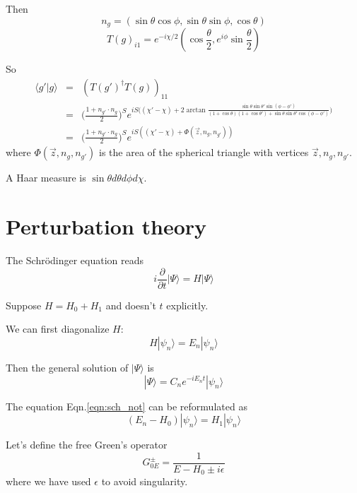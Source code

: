 \documentclass[12pt]{book}
\begin{document}
	Then
	\begin{equation}
		n_g=(\sin\theta\cos\phi,\sin\theta\sin\phi,\cos\theta)
	\end{equation}
	\begin{equation}
		T(g)_{i1}=e^{-i\chi/2}(\cos\frac \theta 2,e^{i\phi}\sin\frac \theta 2)
	\end{equation}
	
	So
	\begin{eqnarray}
		\langle g'|g\rangle&=&(T(g')^\dagger T(g))_{11}\\
		&=&\Big(\frac{1+n_{g'}\cdot n_g}2\Big)^Se^{iS\big((\chi'-\chi)+2\arctan\frac{\sin\theta\sin\theta'\sin(\phi-\phi')}{(1+\cos\theta)(1+\cos\theta')+\sin\theta\sin\theta'\cos(\phi-\phi')}\big)}\\
		&=&\Big(\frac{1+n_{g'}\cdot n_g}2\Big)^Se^{iS((\chi'-\chi)+\Phi(\vec z,n_g,n_{g'}))}
	\end{eqnarray}
	where $\Phi(\vec z,n_g,n_{g'})$ is the area of the spherical triangle with vertices $\vec z,n_g,n_{g'}$.
	
	A Haar measure is $\sin\theta d\theta d\phi d\chi$.
	\section{Perturbation theory}
	
	The Schr\"odinger equation reads
	\begin{equation}
		i\frac\partial{\partial t}|\Psi\rangle=H|\Psi\rangle
	\end{equation}
	
	Suppose $H=H_0+H_1$ and doesn't $t$ explicitly.
	
	We can first diagonalize $H$:
	\begin{equation}
		H|\psi_n\rangle=E_n|\psi_n\rangle
		\label{eqn:sch_not}
	\end{equation} 
	
	Then the general solution of $|\Psi\rangle$ is
	\begin{equation}
		|\Psi\rangle=C_ne^{-iE_nt}|\psi_n\rangle
	\end{equation}                   
	
	The equation Eqn.\ref{eqn:sch_not} can be reformulated as
	\begin{equation}
		(E_n-H_0)|\psi_n\rangle=H_1|\psi_n\rangle
	\end{equation} 
	
	Let's define the free Green's operator
	\begin{equation}
		G_{0E}^\pm=\frac 1{E-H_0\pm i\epsilon}
	\end{equation}
	where we have used $\epsilon$ to avoid singularity.
	
\end{document}
